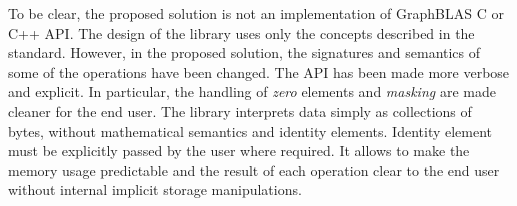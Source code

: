 To be clear, the proposed solution is not an implementation of GraphBLAS C or C++ API. 
The design of the library uses only the concepts described in the standard. 
However, in the proposed solution, the signatures and semantics of some of the operations have been changed. 
The API has been made more verbose and explicit. 
In particular, the handling of \textit{zero} elements and \textit{masking} are made cleaner for the end user. The library interprets data simply as collections of bytes, without mathematical semantics and identity elements.
Identity element must be explicitly passed by the user where required. It allows to make the memory usage predictable and the result of each operation clear to the end user without internal implicit storage manipulations.